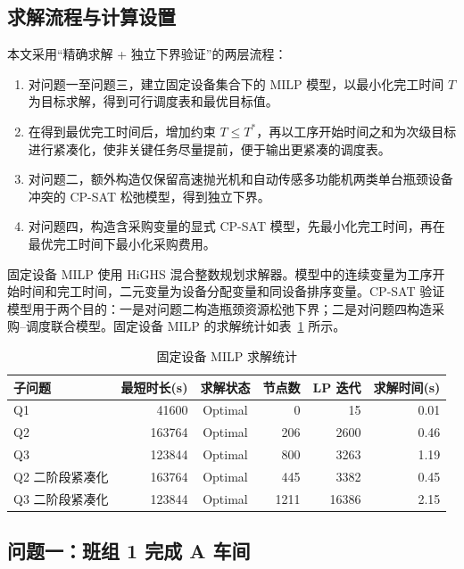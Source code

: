 \subsection{求解流程与计算设置}

本文采用``精确求解 + 独立下界验证''的两层流程：
\begin{enumerate}
  \item 对问题一至问题三，建立固定设备集合下的 MILP 模型，以最小化完工时间 $T$ 为目标求解，得到可行调度表和最优目标值。
  \item 在得到最优完工时间后，增加约束 $T\le T^\ast$，再以工序开始时间之和为次级目标进行紧凑化，使非关键任务尽量提前，便于输出更紧凑的调度表。
  \item 对问题二，额外构造仅保留高速抛光机和自动传感多功能机两类单台瓶颈设备冲突的 CP-SAT 松弛模型，得到独立下界。
  \item 对问题四，构造含采购变量的显式 CP-SAT 模型，先最小化完工时间，再在最优完工时间下最小化采购费用。
\end{enumerate}

固定设备 MILP 使用 HiGHS 混合整数规划求解器。模型中的连续变量为工序开始时间和完工时间，二元变量为设备分配变量和同设备排序变量。CP-SAT 验证模型用于两个目的：一是对问题二构造瓶颈资源松弛下界；二是对问题四构造采购--调度联合模型。固定设备 MILP 的求解统计如表~\ref{tab:milp-stats} 所示。

\begin{table}[!htbp]
  \centering
  \caption{固定设备 MILP 求解统计}
  \label{tab:milp-stats}
  \renewcommand{\arraystretch}{1.2}
  \begin{tabularx}{\textwidth}{X r c r r r}
    \toprule
    子问题 & 最短时长(s) & 求解状态 & 节点数 & LP 迭代 & 求解时间(s) \\
    \midrule
    Q1 & 41600 & Optimal & 0 & 15 & 0.01 \\
    Q2 & 163764 & Optimal & 206 & 2600 & 0.46 \\
    Q3 & 123844 & Optimal & 800 & 3263 & 1.19 \\
    Q2 二阶段紧凑化 & 163764 & Optimal & 445 & 3382 & 0.45 \\
    Q3 二阶段紧凑化 & 123844 & Optimal & 1211 & 16386 & 2.15 \\
    \bottomrule
  \end{tabularx}
\end{table}

\subsection{问题一：班组 1 完成 A 车间}

